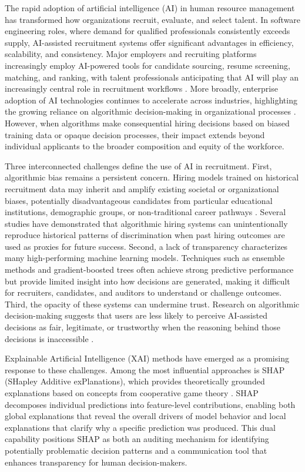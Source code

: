 \documentclass[conference]{IEEEtran}
\begin{document}
The rapid adoption of artificial intelligence (AI) in human resource management has transformed how organizations recruit, evaluate, and select talent. In software engineering roles, where demand for qualified professionals consistently exceeds supply, AI-assisted recruitment systems offer significant advantages in efficiency, scalability, and consistency. Major employers and recruiting platforms increasingly employ AI-powered tools for candidate sourcing, resume screening, matching, and ranking, with talent professionals anticipating that AI will play an increasingly central role in recruitment workflows \cite{linkedin2024}. More broadly, enterprise adoption of AI technologies continues to accelerate across industries, highlighting the growing reliance on algorithmic decision-making in organizational processes \cite{ibm2024}. However, when algorithms make consequential hiring decisions based on biased training data or opaque decision processes, their impact extends beyond individual applicants to the broader composition and equity of the workforce.

Three interconnected challenges define the use of AI in recruitment. First, algorithmic bias remains a persistent concern. Hiring models trained on historical recruitment data may inherit and amplify existing societal or organizational biases, potentially disadvantageous candidates from particular educational institutions, demographic groups, or non-traditional career pathways \cite{fabris2023}. Several studies have demonstrated that algorithmic hiring systems can unintentionally reproduce historical patterns of discrimination when past hiring outcomes are used as proxies for future success. Second, a lack of transparency characterizes many high-performing machine learning models. Techniques such as ensemble methods and gradient-boosted trees often achieve strong predictive performance but provide limited insight into how decisions are generated, making it difficult for recruiters, candidates, and auditors to understand or challenge outcomes. Third, the opacity of these systems can undermine trust. Research on algorithmic decision-making suggests that users are less likely to perceive AI-assisted decisions as fair, legitimate, or trustworthy when the reasoning behind those decisions is inaccessible \cite{eu_hleg2019,binns2018}.

Explainable Artificial Intelligence (XAI) methods have emerged as a promising response to these challenges. Among the most influential approaches is SHAP (SHapley Additive exPlanations), which provides theoretically grounded explanations based on concepts from cooperative game theory \cite{lundberg2017}. SHAP decomposes individual predictions into feature-level contributions, enabling both global explanations that reveal the overall drivers of model behavior and local explanations that clarify why a specific prediction was produced. This dual capability positions SHAP as both an auditing mechanism for identifying potentially problematic decision patterns and a communication tool that enhances transparency for human decision-makers.
\end{document}
